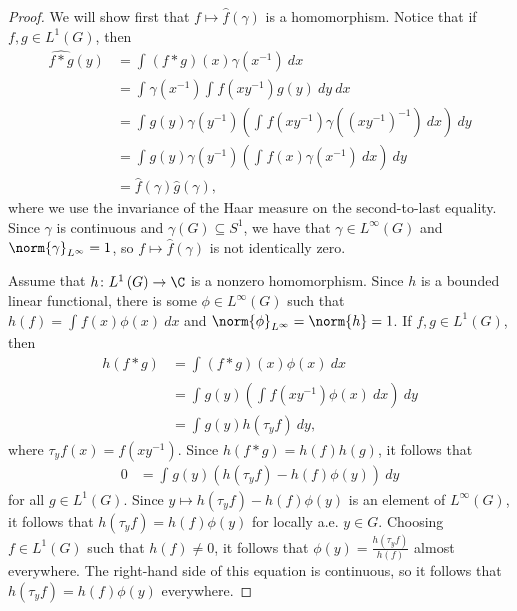 \documentclass[10pt]{mypackage}
\begin{document}
\begin{proof}
  We will show first that $f\mapsto \hat{f}\left( \gamma \right)$ is a homomorphism. Notice that if $f,g\in L^1\left( G \right)$, then
  \begin{align*}
    \widehat{f\ast g}(y) &= \int_{}^{} \left( f\ast g \right)\left( x \right)\gamma\left( x^{-1} \right)\:dx\\
                         &= \int_{}^{} \gamma\left( x^{-1} \right)\int_{}^{} f\left( xy^{-1} \right)g(y)\:dy\:dx\\
                         &= \int_{}^{} g\left( y \right)\gamma\left( y^{-1} \right)\left( \int_{}^{} f\left( xy^{-1} \right)\gamma\left( \left( xy^{-1} \right)^{-1} \right)\:dx \right)\:dy\\
                         &= \int_{}^{} g\left( y \right)\gamma\left( y^{-1} \right)\left( \int_{}^{} f\left( x \right)\gamma\left( x^{-1} \right)\:dx \right)\:dy\\
                         &= \hat{f}\left( \gamma \right)\hat{g}\left( \gamma \right),
  \end{align*}
  where we use the invariance of the Haar measure on the second-to-last equality. Since $\gamma$ is continuous and $\gamma\left( G \right)\subseteq S^1$, we have that $\gamma\in L^{\infty}\left( G \right)$ and $\norm{\gamma}_{L^{\infty}} = 1$, so $f\mapsto \hat{f}\left( \gamma \right)$ is not identically zero.

  Assume that $h\colon L^1\left( G \right)\to \C$ is a nonzero homomorphism. Since $h$ is a bounded linear functional, there is some $\phi\in L^{\infty}\left( G \right)$ such that $h(f) = \int_{}^{} f(x)\phi(x)\:dx$ and $\norm{\phi}_{L^{\infty}} = \norm{h} = 1$. If $f,g\in L^1\left( G \right)$, then
  \begin{align*}
    h\left( f\ast g \right) &= \int_{}^{} \left( f\ast g \right)(x)\phi(x)\:dx\\
                            &= \int_{}^{} g(y)\left( \int_{}^{} f\left( xy^{-1} \right)\phi(x)\:dx \right)\:dy\\
                            &= \int_{}^{} g(y)h\left( \tau_yf \right)\:dy,
  \end{align*}
  where $\tau_yf(x) = f\left( xy^{-1} \right)$. Since $h\left( f\ast g \right) = h(f)h(g)$, it follows that
  \begin{align*}
    0 &= \int_{}^{} g(y)\left( h\left( \tau_yf \right) - h(f)\phi(y) \right)\:dy
  \end{align*}
  for all $g\in L^1\left( G \right)$. Since $y\mapsto h\left( \tau_yf \right)-h(f)\phi(y)$ is an element of $L^{\infty}\left( G \right)$, it follows that $h\left( \tau_yf \right) = h(f)\phi(y)$ for locally a.e. $y\in G$. Choosing $f\in L^1\left( G \right)$ such that $h(f) \neq 0$, it follows that $\phi(y) = \frac{h\left( \tau_yf \right)}{h(f)}$ almost everywhere. The right-hand side of this equation is continuous, so it follows that $h\left( \tau_yf \right) = h(f)\phi(y)$ everywhere.


\end{proof}
\end{document}

